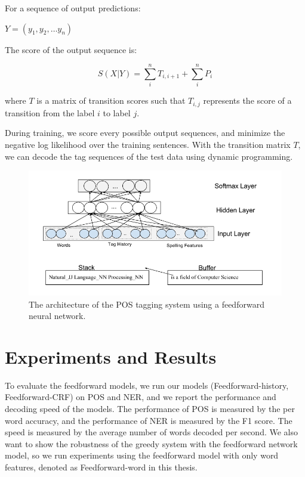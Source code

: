 \documentclass{sfuthesis}
\begin{document}
For a sequence of output predictions:

\begin{center}
$Y=\left( y_{1},y_{2},\ldots y_{n}\right)$
\end{center}

The score of the output sequence is:

\begin{equation}
S\left( X|Y\right)=\sum _{i}^{n}T_{i,i+1}+\sum _{i}^{n}P_{i}
\end{equation}

where $T$ is a matrix of transition scores such that $T_{i,j}$ represents the score of a transition from the label $i$ to label $j$.

During training, we score every possible output sequences, and minimize the negative log likelihood over the training sentences. With the transition matrix $T$, we can decode the tag sequences of the test data using dynamic programming.



\begin{figure}
  \centering
  \includegraphics[scale=0.6]{greedypos.png}
 \caption{The architecture of the POS tagging system using a feedforward neural network.}
  \label{fig:greedypos}
\end{figure}


\section{Experiments and Results}
To evaluate the feedforward models, we run our models (Feedforward-history, Feedforward-CRF) on POS and NER, and we report the performance and decoding speed of the models. The performance of POS is measured by the per word accuracy, and the performance of NER is measured by the F1 score. The speed is measured by the average number of words decoded per second. We also want to show the robustness of the greedy system with the feedforward network model, so we run experiments using the feedforward model with only word features, denoted as Feedforward-word in this thesis. 
\end{document}
